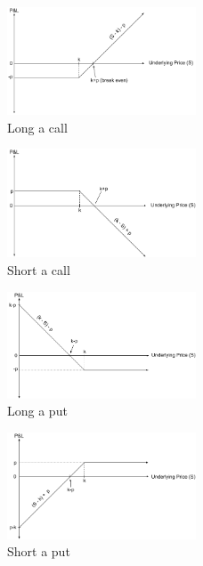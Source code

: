 \documentclass[12pt, a4paper, notitlepage]{article}
\numberwithin{equation}{subsection}
\numberwithin{figure}{subsection}
\numberwithin{table}{subsection}
\begin{document}
\begin{multicols}{2}
  \begin{figure}[H]
      \caption{Long a call}
      \centerline{\includegraphics[width=0.5\textwidth]{Long_Call_Position}}
      \label{fig:LongACall}
  \end{figure}
  \begin{figure}[H]
      \caption{Short a call}
      \centerline{\includegraphics[width=0.5\textwidth]{Short_Call_Position}}
      \label{fig:ShortACall}
  \end{figure}
\end{multicols}

\begin{multicols}{2}
  \begin{figure}[H]
    \caption{Long a put}
    \centerline{\includegraphics[width=0.5\textwidth]{Long_Put_Position}}
    \label{fig:LongAPut}
  \end{figure}
  \begin{figure}[H]
    \caption{Short a put}
    \centerline{\includegraphics[width=0.5\textwidth]{Short_Put_Position}}
    \label{fig:ShortAPut}
  \end{figure}
\end{multicols}
\end{document}
